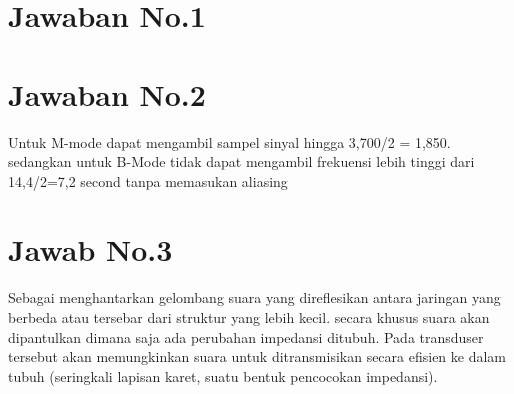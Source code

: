 
\section{Jawaban No.1}


\section{Jawaban No.2}
Untuk M-mode dapat mengambil sampel sinyal hingga 3,700/2 = 1,850. sedangkan untuk B-Mode tidak dapat mengambil frekuensi lebih tinggi dari 14,4/2=7,2 second tanpa memasukan aliasing

\section{Jawab No.3}
Sebagai menghantarkan gelombang suara yang direflesikan antara jaringan yang berbeda atau tersebar dari struktur yang lebih kecil. secara khusus suara akan dipantulkan dimana saja ada perubahan impedansi ditubuh.
Pada transduser tersebut akan memungkinkan suara untuk ditransmisikan secara efisien ke dalam tubuh (seringkali lapisan karet, suatu bentuk pencocokan impedansi).